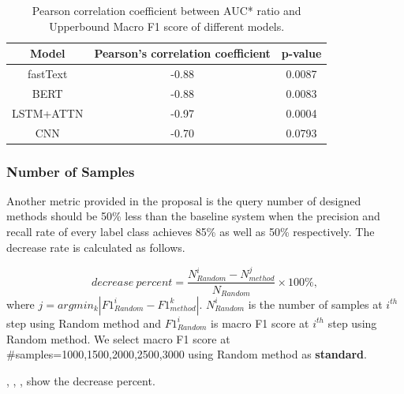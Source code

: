 \begin{table}[th]
	\scriptsize
	\centering
	\begin{tabular}{ccc}
		\toprule
		Model & Pearson's correlation coefficient & p-value\\ \hline
		fastText & -0.88 & 0.0087\\
		BERT & -0.88 & 0.0083\\
		LSTM+ATTN & -0.97 & 0.0004\\
		CNN & -0.70 & 0.0793\\
		\bottomrule
	\end{tabular}
	\caption{Pearson correlation coefficient
		 between AUC* ratio and Upperbound Macro F1 score of different models.}
	\label{table:pearson}
\end{table}



\subsubsection{Number of Samples}
Another metric provided in the proposal is the query number of designed methods should be 50\% less than the baseline system when the precision and recall rate of every label class achieves 85\% as well as 50\% respectively. The decrease rate is calculated as follows.

$$decrease\ percent = \frac{N_{Random}^{i}-N_{method}^{j}}{N_{Random}} \times 100\%,$$
where $j = argmin_{k} |F1_{Random}^{i} - F1_{method}^{k}|$. $N_{Random}^{i}$ is the number of samples at $i^{th}$ step using Random method and $F1_{Random}^{i}$ is macro F1 score at $i^{th}$ step using Random method.  We select macro F1 score at \#samples=1000,1500,2000,2500,3000 using Random method as \textbf{standard}.

,  , , show the decrease percent.


